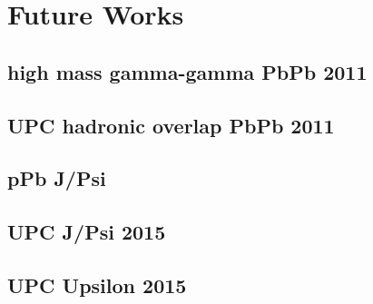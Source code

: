 \chapter{Future Works}	
  \section{high mass gamma-gamma PbPb 2011}
  \section{UPC hadronic overlap PbPb 2011}
  \section{pPb J/Psi}
  \section{UPC J/Psi 2015}
  \section{UPC Upsilon 2015}

